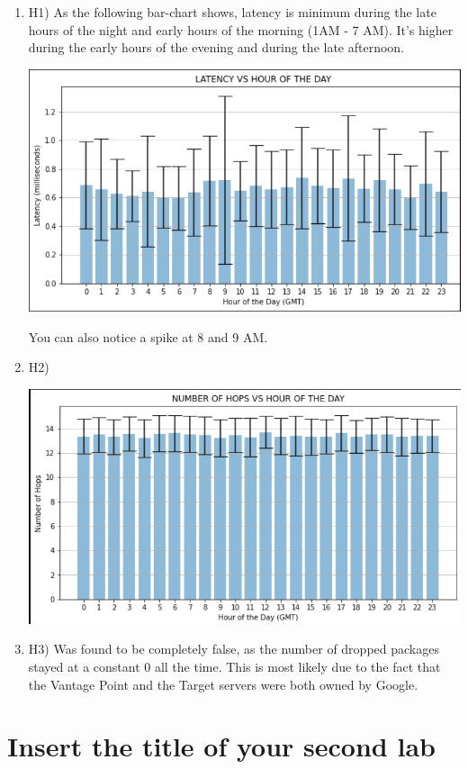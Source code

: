 \documentclass[a4paper,10pt]{article}
\begin{document}
\begin{enumerate}

\item H1) As the following bar-chart shows, latency is minimum during the late hours of the night and early hours of the morning (1AM - 7 AM). It's higher during the early hours of the evening and during the late afternoon. 

\includegraphics{latency_graph}

You can also notice a spike at 8 and 9 AM.

\item H2)

\includegraphics{hops_graph}


\item H3) Was found to be completely false, as the number of dropped packages stayed at a constant 0 all the time. This is most likely due to the fact that the Vantage Point and the Target servers were both owned by Google.

\end{enumerate}


\section{Insert the title of your second lab}
\end{document}
